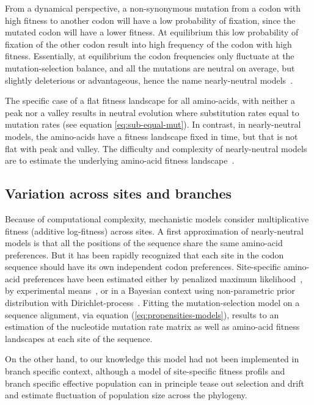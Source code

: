 From a dynamical perspective, a non-synonymous mutation from a \gls{codon} with high fitness to another \gls{codon} will have a low probability of fixation, since the mutated \gls{codon} will have a lower fitness.
At equilibrium this low probability of fixation of the other \gls{codon} result into high frequency of the \gls{codon} with high fitness.
Essentially, at equilibrium the \gls{codon} frequencies only fluctuate at the mutation-selection balance, and all the mutations are \gls{neutral} on average, but slightly deleterious or advantageous, hence the name \gls{nearly-neutral} models~\citep{Ohta1973, Ohta1992, Rodrigue2016}.

The specific case of a flat fitness landscape for all amino-acids, with neither a peak nor a valley results in \gls{neutral} evolution where \gls{substitution} rates equal to mutation rates (see equation \ref{eq:sub-equal-mut}).
In contrast, in \gls{nearly-neutral} models, the amino-acids have a fitness landscape fixed in time, but that is not flat with peak and valley.
The difficulty and complexity of \gls{nearly-neutral} models are to estimate the underlying amino-acid fitness landscape~\citep{Halpern1998}.

\subsection{Variation across sites and branches}
\label{subsec:variation-across-sites-and-branches}
Because of computational complexity, mechanistic models consider multiplicative fitness (additive log-fitness) across sites.
A first approximation of \gls{nearly-neutral} models is that all the positions of the sequence share the same amino-acid preferences.
But it has been rapidly recognized that each site in the \gls{codon} sequence should have its own independent \gls{codon} preferences.
Site-specific amino-acid preferences have been estimated either by penalized maximum \gls{likelihood}~\citep{Tamuri2012,Tamuri2014}, by experimental means~\citep{Bloom2017}, or in a Bayesian context using non-parametric prior distribution with \gls{Dirichlet-process}~\citep{Rodrigue2010, Rodrigue2014}.
Fitting the mutation-selection model on a sequence alignment, via equation (\ref{eq:propensities-models}), results to an estimation of the nucleotide mutation rate matrix as well as amino-acid fitness landscapes at each site of the sequence.

On the other hand, to our knowledge this model had not been implemented in branch specific context, although a model of site-specific fitness profils and branch specific effective population can in principle tease out selection and drift and estimate fluctuation of population size across the phylogeny.


